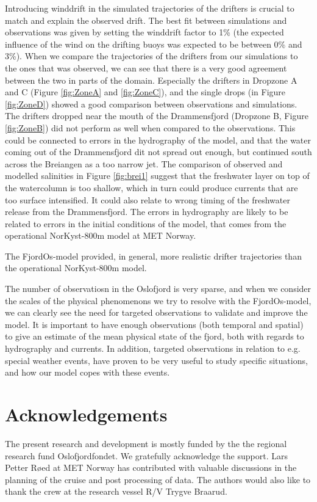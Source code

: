 \documentclass[12pt,a4paper,english]{article}
\begin{document}
Introducing winddrift in the simulated trajectories of the drifters is crucial to match and explain the observed drift. The best fit between simulations and observations was given by setting the winddrift factor to 1\% (the expected influence of the wind on the drifting buoys was expected to be between 0\% and 3\%). When we compare the trajectories of the drifters from our simulations to the ones that was observed, we can see that there is a very good agreement between the two in parts of the domain. Especially the drifters in Dropzone A and C (Figure \ref{fig:ZoneA} and \ref{fig:ZoneC}), and the single drops (in Figure \ref{fig:ZoneD}) showed a good comparison between observations and simulations. The drifters dropped near the mouth of the Drammensfjord (Dropzone B, Figure \ref{fig:ZoneB}) did not perform as well when compared to the observations. This could be connected to errors in the hydrography of the model, and that the water coming out of the Drammensfjord dit not spread out enough, but continued south across the Breiangen as a too narrow jet. The comparison of observed and modelled salinities in Figure \ref{fig:brei1} suggest that the freshwater layer on top of the watercolumn is too shallow, which in turn could produce currents that are too surface intensified. It could also relate to wrong timing of the freshwater release from the Drammensfjord. The errors in hydrography are likely to be related to errors in the initial conditions of the model, that comes from the operational NorKyst-800m model at MET Norway.


The FjordOs-model provided, in general, more realistic drifter trajectories than the operational NorKyst-800m model.


The number of observatiosn in the Oslofjord is very sparse, and when we consider the scales of the physical phenomenons we try to resolve with the FjordOs-model, we can clearly see the need for targeted observations to validate and improve the model. It is important to have enough observations (both temporal and spatial) to give an estimate of the mean physical state of the fjord, both with regards to hydrography and currents. In addition, targeted observations in relation to e.g. special weather events, have proven to be very useful to study specific situations, and how our model copes with these events.




\clearpage
\section*{\hspace{17mm}Acknowledgements}
The present research and development is mostly funded by the the regional research fund Oslofjordfondet. We gratefully acknowledge the support. Lars Petter R\o ed at MET Norway has contributed with valuable discussions in the planning of the cruise and post processing of data. The authors would also like to thank the crew at the research vessel R/V Trygve Braarud. 
\end{document}
